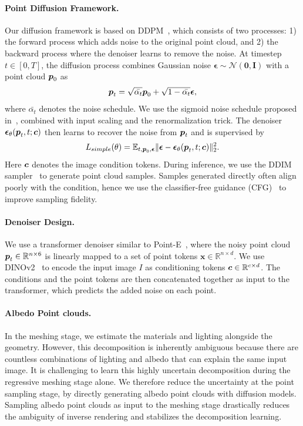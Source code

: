 \paragraph{Point Diffusion Framework.}
Our diffusion framework is based on DDPM~\cite{ho2020denoising}, which consists of two processes: 1) the forward process which adds noise to the original point cloud, and 2) the backward process where the denoiser learns to remove the noise. At timestep $t \in [0, T]$, the diffusion process combines Gaussian noise $\boldsymbol{\epsilon} \sim \mathcal{N}(\mathbf{0},\mathbf{I})$ with a point cloud $\boldsymbol{p}_0$ as
\begin{equation}
    \boldsymbol{p}_t = \sqrt{\bar{\alpha_t}} \boldsymbol{p}_0 + \sqrt{1 - \bar{\alpha_t}} \boldsymbol{\epsilon},
\end{equation}
where $\bar{\alpha_t}$ denotes the noise schedule. We use the sigmoid noise schedule proposed in~\cite{chen2023importance}, combined with input scaling and the renormalization trick. The denoiser $\boldsymbol{\epsilon}_\theta (\boldsymbol{p}_t, t; \boldsymbol{c})$ then learns to recover the noise from $\boldsymbol{p}_t$ and is supervised by
\begin{equation}
    L_{simple}(\theta) = \mathbb{E}_{t,\boldsymbol{p}_0,\boldsymbol{\epsilon}} \lVert \boldsymbol{\epsilon} - \boldsymbol{\epsilon}_\theta (\boldsymbol{p}_t, t; \boldsymbol{c}) \rVert_2^2.
\end{equation}
Here $\boldsymbol{c}$ denotes the image condition tokens. During inference, we use the DDIM sampler~\cite{songdenoising} to generate point cloud samples. Samples generated directly often align poorly with the condition, hence we use the classifier-free guidance (CFG)~\cite{ho2022classifier} to improve sampling fidelity. 

\paragraph{Denoiser Design.}
We use a transformer denoiser similar to Point-E~\cite{nichol2022point}, where the noisy point cloud $\boldsymbol{p}_t \in \mathbb{R}^{n \times 6}$ is linearly mapped to a set of point tokens $\boldsymbol{x} \in \mathbb{R}^{n \times d}$. We use DINOv2~\cite{oquab2023dinov2} to encode the input image $I$ as conditioning tokens $\boldsymbol{c} \in \mathbb{R}^{c \times d}$. The conditions and the point tokens are then concatenated together as input to the transformer, which predicts the added noise on each point. 

\paragraph{Albedo Point clouds.}
In the meshing stage, we estimate the materials and lighting alongside the geometry. However, this decomposition is inherently ambiguous because there are countless combinations of lighting and albedo that can explain the same input image. It is challenging to learn this highly uncertain decomposition during the regressive meshing stage alone. We therefore reduce the uncertainty at the point sampling stage, by directly generating albedo point clouds with diffusion models. Sampling albedo point clouds as input to the meshing stage drastically reduces the ambiguity of inverse rendering and stabilizes the decomposition learning.

